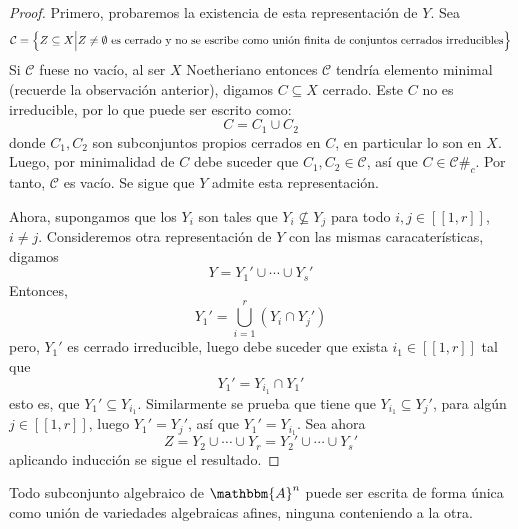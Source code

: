 \documentclass[12pt]{report}
\theoremstyle{largebreak}
\newcommand\natint[1]{\ensuremath{\left[\!\left[ #1\right]\!\right]}}
\newcommand{\contradiction}{\ensuremath{\#_c}}
\newcommand{\bbm}[1]{\ensuremath{\mathbbm{#1}}}
\begin{document}
    \begin{proof}
        Primero, probaremos la existencia de esta representación de $Y$. Sea
        \begin{equation*}
            \mathcal{C}=\left\{Z\subseteq X\Big|Z\neq\emptyset\textup{ es cerrado y no se escribe como unión finita de conjuntos cerrados irreducibles} \right\}
        \end{equation*}
        Si $\mathcal{C}$ fuese no vacío, al ser $X$ Noetheriano entonces $\mathcal{C}$ tendría elemento minimal (recuerde la observación anterior), digamos $C\subseteq X$ cerrado. Este $C$ no es irreducible, por lo que puede ser escrito como:
        \begin{equation*}
            C=C_1\cup C_2
        \end{equation*}
        donde $C_1,C_2$ son subconjuntos propios cerrados en $C$, en particular lo son en $X$. Luego, por minimalidad de $C$ debe suceder que $C_1,C_2\in\mathcal{C}$, así que $C\in\mathcal{C}$\contradiction. Por tanto, $\mathcal{C}$ es vacío. Se sigue que $Y$ admite esta representación.

        Ahora, supongamos que los $Y_i$ son tales que $Y_i\nsubseteq Y_j$ para todo $i,j\in\natint{1,r}$, $i\neq j$. Consideremos otra representación de $Y$ con las mismas caracaterísticas, digamos
        \begin{equation*}
            Y=Y_1'\cup\cdots\cup Y_s'
        \end{equation*}
        Entonces,
        \begin{equation*}
            Y_1'=\bigcup_{ i=1}^r \left(Y_i\cap Y_j'\right)
        \end{equation*}
        pero, $Y_1'$ es cerrado irreducible, luego debe suceder que exista $i_1\in\natint{1,r}$ tal que
        \begin{equation*}
            Y_1'=Y_{i_1}\cap Y_1'
        \end{equation*}
        esto es, que $Y_1'\subseteq Y_{i_1}$. Similarmente se prueba    que tiene que $Y_{i_1}\subseteq Y_{ j}'$, para algún $j\in\natint{1,r}$, luego $Y_1'=Y_j'$, así que $Y_1'=Y_{i_1}$. Sea ahora
        \begin{equation*}
            Z=Y_2\cup\cdots\cup Y_r=Y_2'\cup\cdots\cup Y_s'
        \end{equation*}
        aplicando inducción se sigue el resultado.
    \end{proof}

    \begin{cor}
        Todo subconjunto algebraico de $\bbm{A}^n$ puede ser escrita de forma única como unión de variedades algebraicas afines, ninguna conteniendo a la otra. 
    \end{cor}
\end{document}
